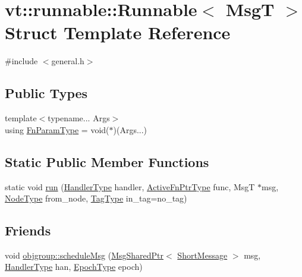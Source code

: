 \hypertarget{structvt_1_1runnable_1_1_runnable}{}\section{vt\+:\+:runnable\+:\+:Runnable$<$ MsgT $>$ Struct Template Reference}
\label{structvt_1_1runnable_1_1_runnable}


{\ttfamily \#include $<$general.\+h$>$}

\subsection*{Public Types}
\begin{DoxyCompactItemize}
\item 
{\footnotesize template$<$typename... Args$>$ }\\using \hyperlink{structvt_1_1runnable_1_1_runnable_aaad8725f31ab762ded7babaaf83574a3}{Fn\+Param\+Type} = void($\ast$)(Args...)
\end{DoxyCompactItemize}
\subsection*{Static Public Member Functions}
\begin{DoxyCompactItemize}
\item 
static void \hyperlink{structvt_1_1runnable_1_1_runnable_a8d99f9d7b1b29545b1595f40a1bd2845}{run} (\hyperlink{namespacevt_af64846b57dfcaf104da3ef6967917573}{Handler\+Type} handler, \hyperlink{namespacevt_a70e19bd64d031e65083c2125b2c65426}{Active\+Fn\+Ptr\+Type} func, MsgT $\ast$msg, \hyperlink{namespacevt_a866da9d0efc19c0a1ce79e9e492f47e2}{Node\+Type} from\+\_\+node, \hyperlink{namespacevt_a84ab281dae04a52a4b243d6bf62d0e52}{Tag\+Type} in\+\_\+tag=no\+\_\+tag)
\end{DoxyCompactItemize}
\subsection*{Friends}
\begin{DoxyCompactItemize}
\item 
void \hyperlink{structvt_1_1runnable_1_1_runnable_abbe5d6061278e82454f36a2c0535d066}{objgroup\+::schedule\+Msg} (\hyperlink{namespacevt_ab2b3d506ec8e8d1540aede826d84a239}{Msg\+Shared\+Ptr}$<$ \hyperlink{namespacevt_a1125ac1da6c0bbf141e0ea0739d7602d}{Short\+Message} $>$ msg, \hyperlink{namespacevt_af64846b57dfcaf104da3ef6967917573}{Handler\+Type} han, \hyperlink{namespacevt_a985a5adf291c34a3ca263b3378388236}{Epoch\+Type} epoch)
\end{DoxyCompactItemize}


